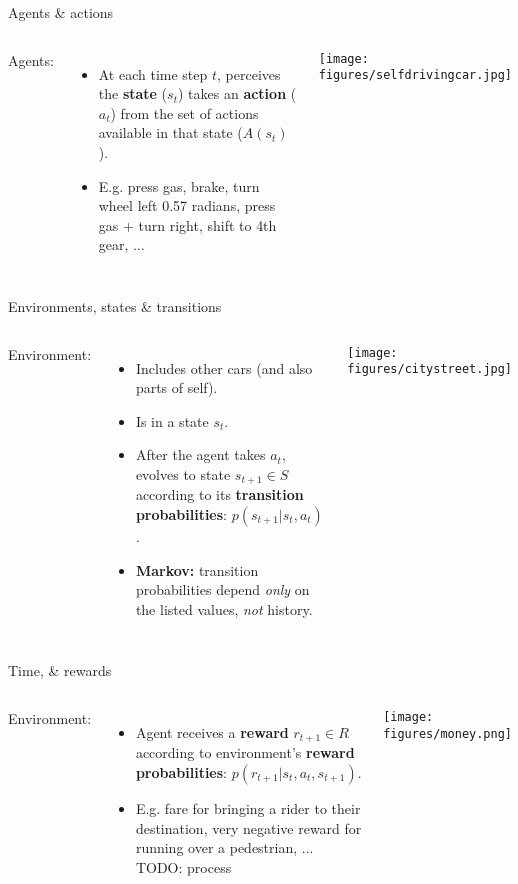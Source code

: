 \documentclass{beamer}
\begin{document}
\begin{frame}{Agents \& actions}
\begin{columns}
Agents:
\begin{itemize}
    \item At each time step \(t\), perceives the \textbf{state} (\(s_t\)) takes an \textbf{action} (\(a_t\)) from the set of actions available in that state (\(A(s_t)\)).
    \item<2-> E.g. press gas, brake, turn wheel left 0.57 radians, press gas + turn right, shift to 4th gear, ...
\end{itemize}
    \begin{center}
    \texttt{[image: figures/selfdrivingcar.jpg]}
    \end{center}
\end{columns}
\end{frame}

\begin{frame}{Environments, states \& transitions}
\begin{columns}
Environment:
\begin{itemize}
    \item Includes other cars (and also parts of self).
    \item<2-> Is in a state \(s_t\). 
    \item<3-> After the agent takes \(a_t\), evolves to state \(s_{t+1} \in S\) according to its \textbf{transition probabilities}: \(p(s_{t+1} | s_t, a_t)\).
    \item<4-> \textbf{Markov:} transition probabilities depend \emph{only} on the listed values, \emph{not} history. 
\end{itemize}
    \begin{center}
    \texttt{[image: figures/citystreet.jpg]}
    \end{center}
\end{columns}
\end{frame}


\begin{frame}{Time, \& rewards}
\begin{columns}
Environment:
\begin{itemize}
    \item Agent receives a \textbf{reward} \(r_{t+1} \in R\) according to environment's \textbf{reward probabilities}: \(p(r_{t+1} | s_t, a_t, s_{t+1})\). 
    \item<2-> E.g. fare for bringing a rider to their destination, very negative reward for running over a pedestrian, ...
    TODO: process
\end{itemize}
    \begin{center}
    \texttt{[image: figures/money.png]}
    \end{center}
\end{columns}
\end{frame}
\end{document}

